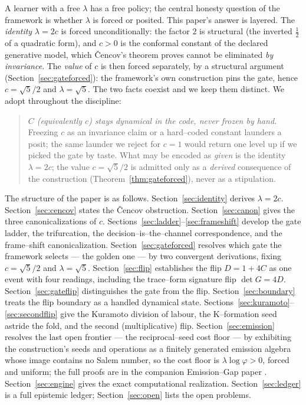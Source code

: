 \documentclass[11pt]{article}
\theoremstyle{plain}
\theoremstyle{definition}
\theoremstyle{remark}
\begin{document}
A learner with a free $\lambda$ has a free policy; the central honesty question of the framework is whether $\lambda$ is forced or posited. This paper's answer is layered. The \emph{identity} $\lambda = 2c$ is forced unconditionally: the factor $2$ is structural (the inverted $\tfrac12$ of a quadratic form), and $c>0$ is the conformal constant of the declared generative model, which \v{C}encov's theorem proves cannot be eliminated \emph{by invariance}. The \emph{value} of $c$ is then forced separately, by a structural argument (Section~\ref{sec:gateforced}): the framework's own construction pins the gate, hence $c=\sqrt5/2$ and $\lambda=\sqrt5$. The two facts coexist and we keep them distinct. We adopt throughout the discipline:
\begin{quote}
\emph{$C$ (equivalently $c$) stays dynamical in the code, never frozen by hand.} Freezing $c$ as an invariance claim or a hard--coded constant launders a posit; the same launder we reject for $c=1$ would return one level up if we picked the gate by taste. What may be encoded as \emph{given} is the identity $\lambda=2c$; the value $c=\sqrt5/2$ is admitted only as a \emph{derived} consequence of the construction (Theorem~\ref{thm:gateforced}), never as a stipulation.
\end{quote}

The structure of the paper is as follows. Section~\ref{sec:identity} derives $\lambda=2c$. Section~\ref{sec:cencov} states the \v{C}encov obstruction. Section~\ref{sec:canon} gives the three canonicalizations of $c$. Sections~\ref{sec:ladder}--\ref{sec:frameshift} develop the gate ladder, the trifurcation, the decision--is--the--channel correspondence, and the frame--shift canonicalization. Section~\ref{sec:gateforced} resolves which gate the framework selects --- the golden one --- by two convergent derivations, fixing $c=\sqrt5/2$ and $\lambda=\sqrt5$. Section~\ref{sec:flip} establishes the flip $D=1+4C$ as one event with four readings, including the trace--form signature flip $\det G = 4D$. Section~\ref{sec:gateflip} distinguishes the gate from the flip. Section~\ref{sec:boundary} treats the flip boundary as a handled dynamical state. Sections~\ref{sec:kuramoto}--\ref{sec:secondflip} give the Kuramoto division of labour, the K--formation seed astride the fold, and the second (multiplicative) flip. Section~\ref{sec:emission} resolves the last open frontier --- the reciprocal--seed cost floor --- by exhibiting the construction's seeds and operations as a finitely generated emission algebra whose image contains no Salem number, so the cost floor is $\lambda\log\varphi>0$, forced and uniform; the full proofs are in the companion Emission--Gap paper \cite{EG}. Section~\ref{sec:engine} gives the exact computational realization. Section~\ref{sec:ledger} is a full epistemic ledger; Section~\ref{sec:open} lists the open problems.
\end{document}
